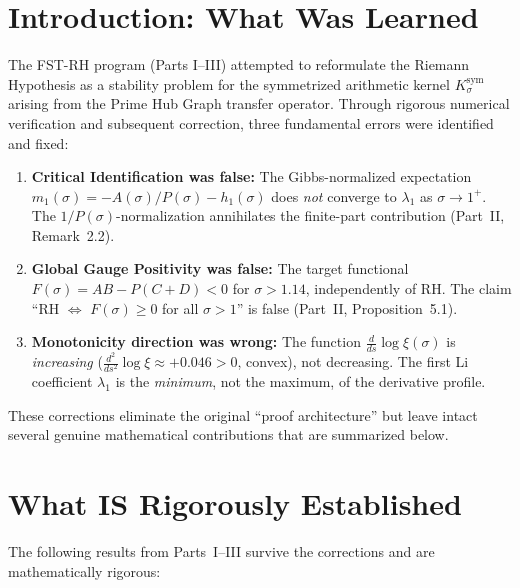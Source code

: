 \documentclass[12pt,a4paper]{article}
\theoremstyle{definition}
\theoremstyle{remark}
\newcommand{\Ksym}{K_\sigma^{\mathrm{sym}}}
\begin{document}
\section{Introduction: What Was Learned}

The FST-RH program (Parts I--III) attempted to reformulate the Riemann Hypothesis as a stability problem for the symmetrized arithmetic kernel $\Ksym$ arising from the Prime Hub Graph transfer operator. Through rigorous numerical verification and subsequent correction, three fundamental errors were identified and fixed:

\begin{enumerate}[label=(K\arabic*)]
  \item \textbf{Critical Identification was false:} The Gibbs-normalized expectation $m_1(\sigma) = -A(\sigma)/P(\sigma) - h_1(\sigma)$ does \emph{not} converge to $\lambda_1$ as $\sigma \to 1^+$. The $1/P(\sigma)$-normalization annihilates the finite-part contribution (Part~II, Remark~2.2).

  \item \textbf{Global Gauge Positivity was false:} The target functional $F(\sigma) = AB - P(C+D) < 0$ for $\sigma > 1.14$, independently of RH. The claim ``RH $\Leftrightarrow$ $F(\sigma) \ge 0$ for all $\sigma > 1$'' is false (Part~II, Proposition~5.1).

  \item \textbf{Monotonicity direction was wrong:} The function $\frac{d}{ds}\log\xi(\sigma)$ is \emph{increasing} ($\frac{d^2}{ds^2}\log\xi \approx +0.046 > 0$, convex), not decreasing. The first Li coefficient $\lambda_1$ is the \emph{minimum}, not the maximum, of the derivative profile.
\end{enumerate}

These corrections eliminate the original ``proof architecture'' but leave intact several genuine mathematical contributions that are summarized below.


\section{What IS Rigorously Established}

The following results from Parts~I--III survive the corrections and are mathematically rigorous:
\end{document}
